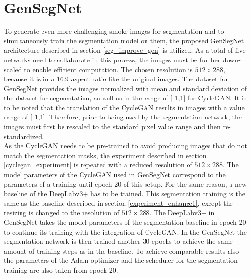 \section{GenSegNet}\label{gen_seg_exp12}
To generate even more challenging smoke images for segmentation and to simultaneously train the segmentation model on them, the proposed GenSegNet architecture described in section \ref{seg_improve_gen} is utilized.
As a total of five networks need to collaborate in this process, the images must be further down-scaled to enable efficient computation.
The chosen resolution is $512\times288$, because it is in a 16:9 aspect ratio like the original images.
The dataset for GenSegNet provides the images normalized with mean and standard deviation of the dataset for segmentation, as well as in the range of [-1,1] for CycleGAN.
It is to be noted that the translation of the CycleGAN results in images with a value range of [-1,1]. 
Therefore, prior to being used by the segmentation network, the images must first be rescaled to the standard pixel value range and then re-standardized.\\
As the CycleGAN needs to be pre-trained to avoid producing images that do not match the segmentation masks, the experiment described in section \ref{cyclegan_experiment} is repeated with a reduced resolution of $512\times288$.
The model parameters of the CycleGAN used in GenSegNet correspond to the parameters of a training until epoch 20 of this setup.
For the same reason, a new baseline of the DeepLabv3+ has to be trained.
This segmentation training is the same as the baseline described in section \ref{experiment_enhance1}, except the resizing is changed to the resolution of $512\times288$.
The DeepLabv3+ in GenSegNet takes the model parameters of the segmentation baseline in epoch 20 to continue its training with the integration of CycleGAN.
In the GenSegNet the segmentation network is then trained another 30 epochs to achieve the same amount of training steps as in the baseline.
To achieve comparable results also the parameters of the Adam optimizer and the scheduler for the segmentation training are also taken from epoch 20.\\
